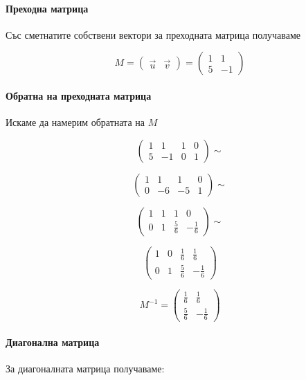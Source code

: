 \documentclass{scrartcl}
\begin{document}
\paragraph{Преходна матрица}

Със сметнатите собствени вектори за преходната матрица получаваме

$$
M =
\begin{pmatrix}
    \overrightarrow{u} & \overrightarrow{v}
\end{pmatrix}
=
\begin{pmatrix}
    1 & 1\\5 & -1
\end{pmatrix}
$$

\paragraph{Обратна на преходната матрица}

Искаме да намерим обратната на $M$

\[
\left(
\begin{array}{cc|cc}
1 & 1 & 1 & 0 \\
5 & -1 & 0 & 1
\end{array}
\right)\sim
\]

\[
\left(
\begin{array}{cc|cc}
1 & 1 & 1 & 0 \\
0 & -6 & -5 & 1
\end{array}
\right)\sim
\]

\[
\left(
\begin{array}{cc|cc}
1 & 1 & 1 & 0 \\
0 & 1 & \frac{5}{6} & -\frac{1}{6}
\end{array}
\right)\sim
\]

\[
\left(
\begin{array}{cc|cc}
1 & 0 & \frac{1}{6} & \frac{1}{6} \\
0 & 1 & \frac{5}{6} & -\frac{1}{6}
\end{array}
\right)
\]


$$
M^{-1} =
\begin{pmatrix}
    \frac{1}{6} & \frac{1}{6} \\ \frac{5}{6} & -\frac{1}{6}
\end{pmatrix}
$$

\paragraph{Диагонална матрица}

За диагоналната матрица получаваме:
\end{document}
